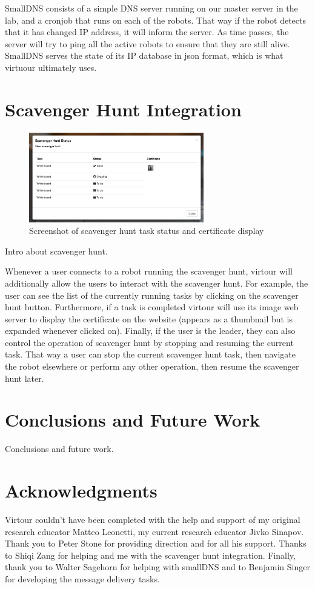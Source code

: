 \documentclass[
  oneside,
  11pt, a4paper,
  footinclude=true,
  headinclude=true,
  cleardoublepage=empty
]{article}
\begin{document}
SmallDNS consists of a simple DNS server running on our master server in the
lab, and a cronjob that runs on each of the robots. That way if the robot
detects that it has changed IP address, it will inform the server. As time
passes, the server will try to ping all the active robots to ensure that they
are still alive. SmallDNS serves the state of its IP database in json
format, which is what virtuour ultimately uses.

\section{Scavenger Hunt Integration}

\begin{figure}
\centering
\includegraphics[width=3in]{scav_certs}
\caption{Screenshot of scavenger hunt task status and certificate display}
\end{figure}

Intro about scavenger hunt.

Whenever a user connects to a robot running the scavenger hunt, virtour will
additionally allow the users to interact with the scavenger hunt. For example,
the user can see the list of the currently running tasks by clicking on the
scavenger hunt button. Furthermore, if a task is completed virtour will use
its image web server to display the certificate on the website (appears as a
thumbnail but is expanded whenever clicked on). Finally, if the user is the
leader, they can also control the operation of scavenger hunt by stopping and
resuming the current task. That way a user can stop the current scavenger hunt
task, then navigate the robot elsewhere or perform any other operation, then
resume the scavenger hunt later.

\section{Conclusions and Future Work}

Conclusions and future work.

\section{Acknowledgments}

Virtour couldn't have been completed with the help and support of my original
research educator Matteo Leonetti, my current research educator Jivko Sinapov.
Thank you to Peter Stone for providing direction and for all his support.
Thanks to Shiqi Zang for helping and me with the scavenger hunt integration.
Finally, thank you to Walter Sagehorn for helping with smallDNS and to Benjamin
Singer for developing the message delivery tasks.
    
\end{document}
